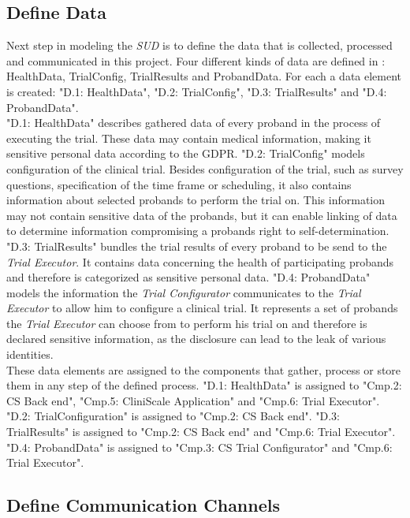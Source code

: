 \subsection{Define Data}
\label{designIdData}
Next step in modeling the \textit{SUD} is to define the data that is collected, processed and communicated in this project. Four different kinds of data are defined in \textit{}: HealthData, TrialConfig, TrialResults and ProbandData. For each a data element is created: "D.1: HealthData", "D.2: TrialConfig", "D.3: TrialResults" and "D.4: ProbandData". \\
\newline
"D.1: HealthData" describes gathered data of every proband in the process of executing the trial. These data may contain medical information, making it sensitive personal data according to the GDPR. "D.2: TrialConfig" models configuration of the clinical trial. Besides configuration of the trial, such as survey questions, specification of the time frame or scheduling, it also contains information about selected probands to perform the trial on. This information may not contain sensitive data of the probands, but it can enable linking of data to determine information compromising a probands right to self-determination. "D.3: TrialResults" bundles the trial results of every proband to be send to the \textit{Trial Executor}. It contains data concerning the health of participating probands and therefore is categorized as sensitive personal data. "D.4: ProbandData" models the information the \textit{Trial Configurator} communicates to the \textit{Trial Executor} to allow him to configure a clinical trial. It represents a set of probands the \textit{Trial Executor} can choose from to perform his trial on and therefore is declared sensitive information, as the disclosure can lead to the leak of various identities.\\
\newline
These data elements are assigned to the components that gather, process or store them in any step of the defined process. "D.1: HealthData" is assigned to "Cmp.2: CS Back end", "Cmp.5: CliniScale Application" and "Cmp.6: Trial Executor". "D.2: TrialConfiguration" is assigned to "Cmp.2: CS Back end". "D.3: TrialResults" is assigned to "Cmp.2: CS Back end" and "Cmp.6: Trial Executor". "D.4: ProbandData" is assigned to "Cmp.3: CS Trial Configurator" and "Cmp.6: Trial Executor".

\subsection{Define Communication Channels}
\label{designIdChannels}

